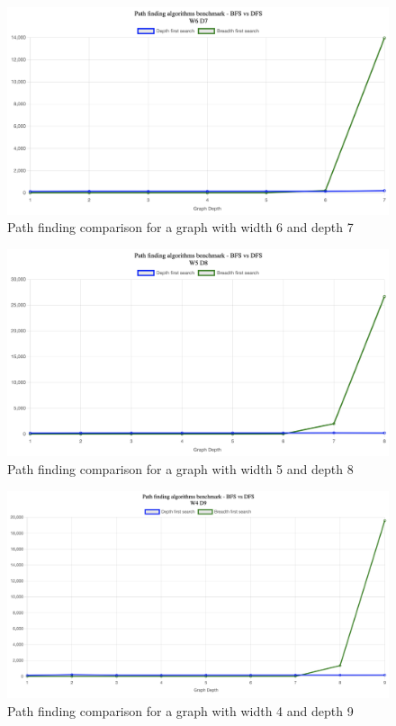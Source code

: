 \documentclass[12pt]{article}
\begin{document}
\begin{figure}[h]
    \centering
    \includegraphics[width=1\textwidth]{images/w6d7.png}
    \caption{Path finding comparison for a graph with width 6 and depth 7}
    \label{fig:w6d7}
\end{figure}

\begin{figure}[h]
    \centering
    \includegraphics[width=1\textwidth]{images/w5d8.png}
    \caption{Path finding comparison for a graph with width 5 and depth 8}
    \label{fig:w5d8}
\end{figure}

\begin{figure}[h]
    \centering
    \includegraphics[width=1\textwidth]{images/w4d9.png}
    \caption{Path finding comparison for a graph with width 4 and depth 9}
    \label{fig:w4d9}
\end{figure}
\end{document}
